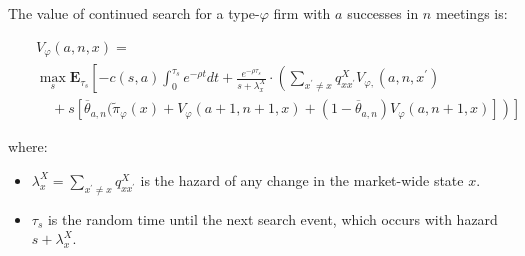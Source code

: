 \documentclass[notes=show]{beamer}
\begin{document}
\begin{frame}%

\label{optimal_search}



The value of continued search for a type-$\varphi $ firm with $a$ successes
in $n$ meetings is:

\begin{eqnarray*}
&&V_{\varphi }(a,n,x)= \\
&&\max_{s}\mathbf{E}_{\tau _{s}}\left[ -c(s,a)\int_{0}^{\tau _{s}}e^{-\rho
t}dt+\frac{e^{-\rho \tau _{s}}}{s+\lambda _{x}^{X}}\cdot \left(
\sum_{x^{\prime }\neq x}q_{xx^{\prime }}^{X}V_{\varphi ,}(a,n,x^{\prime
})\right. \right. \\
&&\left. \left. 
\begin{array}{c}
\; \\ 
\;%
\end{array}%
+s\left[ \overline{\theta }_{a,n}(\widetilde{\pi }_{\varphi }(x)+V_{\varphi
}(a+1,n+1,x)+(1-\overline{\theta }_{a,n})V_{\varphi }(a,n+1,x)\right]
\right) \right]
\end{eqnarray*}

where:

\begin{itemize}
\item $\lambda _{x}^{X}=\sum_{x^{\prime }\neq x}q_{xx^{\prime }}^{X}$ is the
hazard of any change in the market-wide state $x.$

\item $\tau _{s}$ is the random time until the next search event, which
occurs with hazard $s+\lambda _{x}^{X}$.
\end{itemize}

\end{frame}%
\end{document}
